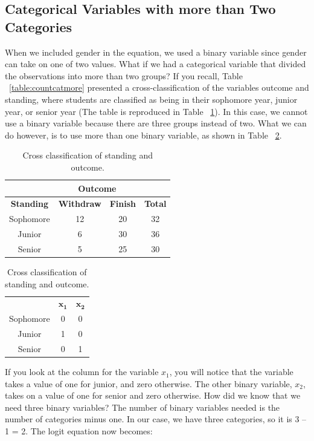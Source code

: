 \documentclass[a4paper,12pt,oneside]{book}
\begin{document}
\subsection{Categorical Variables with more than Two Categories} 
When we included gender in the equation, we used a binary variable since gender can take on one of two values. What if we had a categorical variable that divided the observations into more than two groups? 
If you recall, Table ~\ref{table:countcatmore} presented a cross-classification of the variables outcome and standing, where students are classified as being in their sophomore year, junior year, or senior year 
(The table is reproduced in Table ~\ref{table:countcatmore2}). In this case, we cannot use a binary variable because there are three groups instead of two. What we can do however, is to use more than one binary 
variable, as shown in Table ~\ref{table:countcatmorecode}.
\begin{table}[h!t]
	\caption{Cross classification of standing and outcome.} \label{table:countcatmore2}
	\centering
	\begin{tabular}{c |c c| c}
	\hline
	{} & \multicolumn{2}{|c|}{Outcome} & {} \\
	\hline
	\bf Standing & \bf Withdraw & \bf Finish & \bf Total \\
	Sophomore & 12 & 20 & 32 \\
	Junior & 6 & 30 & 36 \\
	Senior & 5 & 25 & 30 \\
	\hline
	\end{tabular}
\end{table} 
\begin{table}[h!t]
	\caption{Cross classification of standing and outcome.} \label{table:countcatmorecode}
	\centering
	\begin{tabular}{c c c}
	\hline
	{} & $\mathbf{x_1}$ & $\mathbf{x_2}$ \\
	Sophomore & 0 & 0 \\
	Junior & 1 & 0 \\
	Senior & 0 & 1 \\
	\hline
	\end{tabular}
\end{table}
If you look at the column for the variable $x_1$, you will notice that the variable takes a value of one for junior, and zero otherwise. The other binary variable, $x_2$, 
takes on a value of one for senior and zero otherwise. How did we know that we need three binary variables? The number of binary variables needed is the number of categories minus one. 
In our case, we have three categories, so it is 3 – 1 = 2. The logit equation now becomes: 
\end{document}
